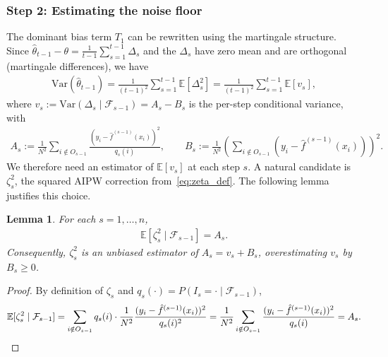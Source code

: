 \documentclass[11pt]{article}
\newtheorem{lemma}[theorem]{Lemma}
\newcommand{\thetahat}{\hat{\theta}}
\newcommand{\fhat}{\hat{f}}
\newcommand{\F}{\mathcal{F}}
\newcommand{\Var}{\mathrm{Var}}
\begin{document}
\subsubsection*{Step 2: Estimating the noise floor}

The dominant bias term $T_1$ can be rewritten using the martingale structure. Since $\thetahat_{t-1} - \theta = \frac{1}{t-1}\sum_{s=1}^{t-1}\Delta_s$ and the $\Delta_s$ have zero mean and are orthogonal (martingale differences), we have
\begin{align}
\label{eq:var-theta-hat}
    \Var(\thetahat_{t-1}) = \frac{1}{(t-1)^2}\sum_{s=1}^{t-1}\mathbb{E}[\Delta_s^2] = \frac{1}{(t-1)^2}\sum_{s=1}^{t-1}\mathbb{E}[v_s],
\end{align}
where $v_s := \Var(\Delta_s \mid \F_{s-1}) = A_s - B_s$ is the per-step conditional variance, with
\begin{align}
\label{eq:As-Bs-def}
    A_s := \frac{1}{N^2}\sum_{i \notin O_{s-1}} \frac{(y_i - \fhat^{(s-1)}(x_i))^2}{q_s(i)}, \qquad B_s := \frac{1}{N^2}\left(\sum_{i \notin O_{s-1}} (y_i - \fhat^{(s-1)}(x_i))\right)^2.
\end{align}
We therefore need an estimator of $\mathbb{E}[v_s]$ at each step $s$. A natural candidate is $\zeta_s^2$, the squared AIPW correction from~\eqref{eq:zeta_def}. The following lemma justifies this choice.

\begin{lemma}
\label{lem:zeta-squared-unbiased}
    For each $s = 1, \ldots, n$,
    \begin{align}
    \label{eq:zeta-squared-As}
        \mathbb{E}\!\left[\zeta_s^2 \mid \F_{s-1}\right] = A_s.
    \end{align}
    Consequently, $\zeta_s^2$ is an unbiased estimator of $A_s = v_s + B_s$, overestimating $v_s$ by $B_s \geq 0$.
\end{lemma}

\begin{proof}
    By definition of $\zeta_s$ and $q_s(\cdot) = P(I_s = \cdot \mid \F_{s-1})$,
    \begin{align*}
        \mathbb{E}[\zeta_s^2 \mid \F_{s-1}] = \sum_{i \notin O_{s-1}} q_s(i) \cdot \frac{1}{N^2}\frac{(y_i - \fhat^{(s-1)}(x_i))^2}{q_s(i)^2} = \frac{1}{N^2}\sum_{i \notin O_{s-1}} \frac{(y_i - \fhat^{(s-1)}(x_i))^2}{q_s(i)} = A_s. \qedhere
    \end{align*}
\end{proof}
\end{document}
